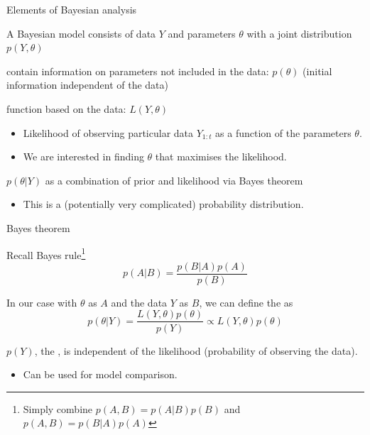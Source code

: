 \begin{frame}{Elements of Bayesian analysis}
\begin{wideitemize}
\item A Bayesian model consists of data $Y$ and parameters $\theta$ with a joint distribution $p(Y,\theta)$
\item {} contain information on parameters not included in the data: $p(\theta)$ (initial information independent of the data)
\item {} function based on the data: $L(Y,\theta)$
\begin{itemize}
    \item Likelihood of observing particular data $Y_{1:t}$ as a function of the parameters $\theta$.
    \item We are interested in finding $\theta$ that maximises the likelihood.
\end{itemize}
\item {} $p(\theta|Y)$ as a combination of prior and likelihood via Bayes theorem
\begin{itemize}
    \item This is a (potentially very complicated) probability distribution.
\end{itemize}
\end{wideitemize}
\end{frame}

\begin{frame}{Bayes theorem}
\begin{wideitemize}
\item Recall Bayes rule\footnote{Simply combine $p(A,B)=p(A|B)p(B)$ and $p(A,B)=p(B|A)p(A)$}
\begin{equation*}
     p(A|B) = \frac{p(B|A)p(A)}{p(B)}
\end{equation*}
\item In our case with $\theta$ as $A$ and the data $Y$ as $B$, we can define the  as 
\begin{equation*}
     p(\theta|Y) = \frac{L(Y,\theta)p(\theta)}{p(Y)} \propto L(Y,\theta)p(\theta)
\end{equation*}
\item $p(Y)$, the , is independent of the likelihood (probability of observing the data).
\begin{itemize}
    \item Can be used for model comparison.
\end{itemize}
\end{wideitemize}
\end{frame}


